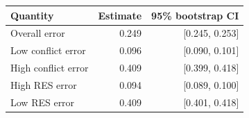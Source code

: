 \begin{tabular}{lrr}
\toprule
Quantity & Estimate & 95\% bootstrap CI \\
\midrule
Overall error & 0.249 & [0.245, 0.253] \\
Low conflict error & 0.096 & [0.090, 0.101] \\
High conflict error & 0.409 & [0.399, 0.418] \\
High RES error & 0.094 & [0.089, 0.100] \\
Low RES error & 0.409 & [0.401, 0.418] \\
\bottomrule
\end{tabular}
